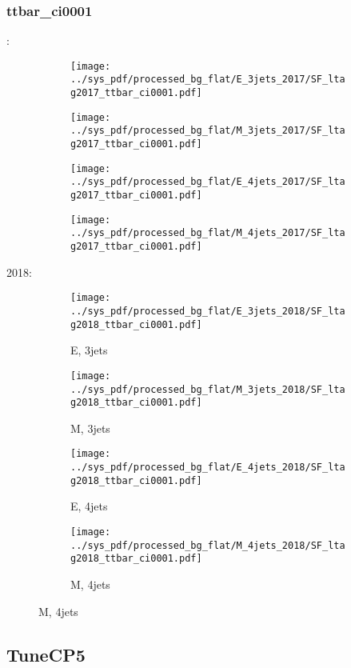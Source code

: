 \documentclass{beamer}
\begin{document}
\begin{frame}
\frametitle{ttbar_ci0001}
\fontsize{5}{1}:
\begin{figure}
\centering
\begin{subfigure}[b]{0.24\textwidth}
\texttt{[image: ../sys\_pdf/processed\_bg\_flat/E\_3jets\_2017/SF\_ltag2017\_ttbar\_ci0001.pdf]}
\end{subfigure}
\begin{subfigure}[b]{0.24\textwidth}
\texttt{[image: ../sys\_pdf/processed\_bg\_flat/M\_3jets\_2017/SF\_ltag2017\_ttbar\_ci0001.pdf]}
\end{subfigure}
\begin{subfigure}[b]{0.24\textwidth}
\texttt{[image: ../sys\_pdf/processed\_bg\_flat/E\_4jets\_2017/SF\_ltag2017\_ttbar\_ci0001.pdf]}
\end{subfigure}
\begin{subfigure}[b]{0.24\textwidth}
\texttt{[image: ../sys\_pdf/processed\_bg\_flat/M\_4jets\_2017/SF\_ltag2017\_ttbar\_ci0001.pdf]}
\end{subfigure}
\end{figure}
2018:
\begin{figure}
\centering
\begin{subfigure}[b]{0.24\textwidth}
\texttt{[image: ../sys\_pdf/processed\_bg\_flat/E\_3jets\_2018/SF\_ltag2018\_ttbar\_ci0001.pdf]}
\captionsetup{font=tiny}
\caption{E, 3jets}
\end{subfigure}
\begin{subfigure}[b]{0.24\textwidth}
\texttt{[image: ../sys\_pdf/processed\_bg\_flat/M\_3jets\_2018/SF\_ltag2018\_ttbar\_ci0001.pdf]}
\captionsetup{font=tiny}
\caption{M, 3jets}
\end{subfigure}
\begin{subfigure}[b]{0.24\textwidth}
\texttt{[image: ../sys\_pdf/processed\_bg\_flat/E\_4jets\_2018/SF\_ltag2018\_ttbar\_ci0001.pdf]}
\captionsetup{font=tiny}
\caption{E, 4jets}
\end{subfigure}
\begin{subfigure}[b]{0.24\textwidth}
\texttt{[image: ../sys\_pdf/processed\_bg\_flat/M\_4jets\_2018/SF\_ltag2018\_ttbar\_ci0001.pdf]}
\captionsetup{font=tiny}
\caption{M, 4jets}
\end{subfigure}
\end{figure}
\end{frame}


\subsection{TuneCP5}
\end{document}

